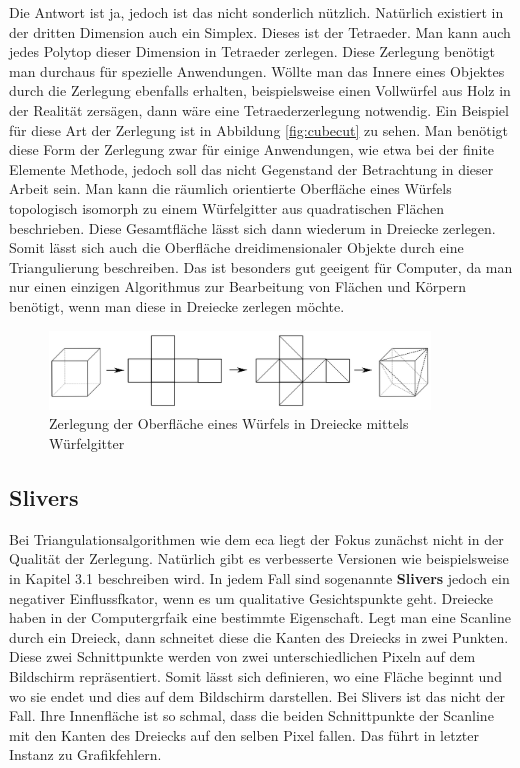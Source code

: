 Die Antwort ist ja, jedoch ist das nicht sonderlich nützlich. Natürlich existiert in der dritten Dimension auch ein Simplex. Dieses ist der Tetraeder. Man kann auch jedes Polytop 
dieser Dimension in Tetraeder zerlegen. Diese Zerlegung benötigt man durchaus für spezielle Anwendungen.  
Wöllte man das Innere eines Objektes durch die Zerlegung ebenfalls erhalten, beispielsweise einen Vollwürfel aus Holz in der 
Realität zersägen, dann wäre eine Tetraederzerlegung notwendig. Ein Beispiel für diese Art der Zerlegung ist in Abbildung \ref{fig:cubecut} zu sehen. 
Man benötigt diese Form der Zerlegung zwar für einige Anwendungen, wie etwa bei der finite Elemente Methode, jedoch soll das nicht Gegenstand der Betrachtung in dieser Arbeit sein.
Man kann die räumlich orientierte Oberfläche eines Würfels topologisch isomorph zu einem Würfelgitter aus quadratischen Flächen beschrieben. Diese Gesamtfläche lässt sich dann 
wiederum in Dreiecke zerlegen. Somit lässt sich auch die Oberfläche dreidimensionaler Objekte durch eine Triangulierung beschreiben. Das ist besonders gut geeigent für Computer, da man nur einen einzigen 
Algorithmus zur Bearbeitung von Flächen und Körpern benötigt, wenn man diese in Dreiecke zerlegen möchte.

\begin{figure}[h]
  \centering
  \includegraphics[width=0.9\textwidth]{bilder/3DZerlegung.png}
  \caption[Zerlegung der Oberfläche eines Würfels in Dreiecke mittels Würfelgitter]{\centering Zerlegung der Oberfläche eines Würfels in Dreiecke mittels Würfelgitter}
  \label{fig:cubenet}
\end{figure}

\subsection{Slivers}

Bei Triangulationsalgorithmen wie dem \ac{eca} liegt der Fokus zunächst nicht in der Qualität der Zerlegung. Natürlich gibt es verbesserte Versionen wie beispielsweise in Kapitel 3.1 beschreiben wird.
In jedem Fall sind sogenannte \textbf{Slivers} jedoch ein negativer Einflussfkator, wenn es um qualitative Gesichtspunkte geht. Dreiecke haben in der Computergrfaik eine bestimmte Eigenschaft. Legt man eine Scanline 
durch ein Dreieck, dann schneitet diese die Kanten des Dreiecks in zwei Punkten. Diese zwei Schnittpunkte werden von zwei unterschiedlichen Pixeln auf dem Bildschirm repräsentiert. Somit lässt sich definieren, 
wo eine Fläche beginnt und wo sie endet und dies auf dem Bildschirm darstellen. Bei Slivers ist das nicht der Fall. Ihre Innenfläche ist so schmal,
dass die beiden Schnittpunkte der Scanline mit den Kanten des Dreiecks auf den selben Pixel fallen. \cite{sliverdef} Das führt in letzter Instanz zu Grafikfehlern. 


